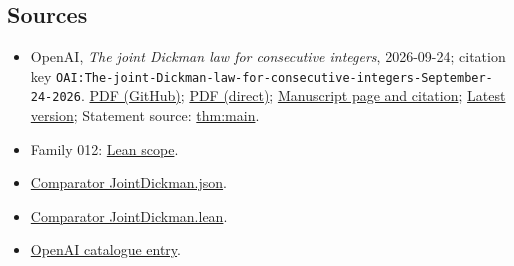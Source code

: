 \documentclass[11pt]{article}
\begin{document}
\subsection{Sources}
\begin{itemize}
\item OpenAI, \emph{The joint Dickman law for consecutive integers}, 2026-09-24; citation key \texttt{OAI:The-joint-Dickman-law-for-consecutive-integers-September-24-2026}. \href{https://github.com/openai/math/blob/adc7f1241b42e322a6451854ab7e4b4c146bf78a/preprints/The-joint-Dickman-law-for-consecutive-integers-September-24-2026/paper.pdf}{PDF (GitHub)}; \href{https://github.com/openai/math/raw/adc7f1241b42e322a6451854ab7e4b4c146bf78a/preprints/The-joint-Dickman-law-for-consecutive-integers-September-24-2026/paper.pdf}{PDF (direct)}; \href{https://github.com/openai/math/blob/adc7f1241b42e322a6451854ab7e4b4c146bf78a/preprints/The-joint-Dickman-law-for-consecutive-integers-September-24-2026/README.md}{Manuscript page and citation}; \href{https://github.com/openai/math/blob/main/preprints/The-joint-Dickman-law-for-consecutive-integers-September-24-2026/paper.pdf}{Latest version}; Statement source: \href{https://github.com/openai/math/blob/adc7f1241b42e322a6451854ab7e4b4c146bf78a/preprints/The-joint-Dickman-law-for-consecutive-integers-September-24-2026/build/sections/introduction.tex\#L19}{thm:main}.
\item Family 012: \href{https://github.com/openai/math/blob/adc7f1241b42e322a6451854ab7e4b4c146bf78a/lean/docs/012.md}{Lean scope}.
\item \href{https://github.com/openai/math/blob/adc7f1241b42e322a6451854ab7e4b4c146bf78a/lean/ComparatorChallenges/JointDickman.json}{Comparator JointDickman.json}.
\item \href{https://github.com/openai/math/blob/adc7f1241b42e322a6451854ab7e4b4c146bf78a/lean/ComparatorChallenges/JointDickman.lean}{Comparator JointDickman.lean}.
\item \href{https://github.com/openai/math/blob/adc7f1241b42e322a6451854ab7e4b4c146bf78a/CONTENTS.md}{OpenAI catalogue entry}.
\end{itemize}
\end{document}
